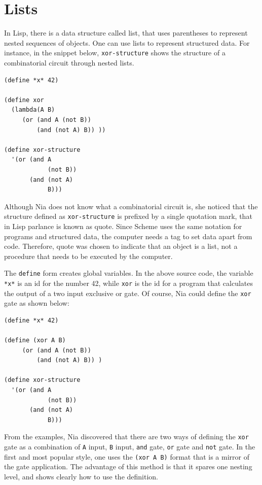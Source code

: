 \documentclass[a4paper,12pt]{book}
\begin{document}
\section{Lists}
In Lisp, there is a data structure called list,
that uses parentheses to represent nested
sequences of objects. One can use lists to
represent structured data.
For instance, in the snippet below,
\verb|xor-structure| shows
the structure of a combinatorial circuit
through nested lists.

\begin{verbatim}
(define *x* 42)

(define xor
  (lambda(A B)
     (or (and A (not B))
         (and (not A) B)) ))

(define xor-structure
  '(or (and A  
            (not B))
       (and (not A) 
            B)))
\end{verbatim}

Although Nia does not know what a combinatorial 
circuit is, she noticed that the structure
defined as \verb|xor-structure| is prefixed by a
single quotation mark, that in Lisp parlance is
known as quote. Since Scheme uses the
same notation for programs and structured
data, the computer needs a tag to set
data apart from code. Therefore, 
quote was chosen to indicate that
an object is a list, not a procedure that
needs to be executed by the computer.

The \verb|define| form creates global
variables. In the above source code,
the variable \verb|*x*| is an id for the
number 42,
while \verb|xor| is the id for a program
that calculates the output of a two
input exclusive or gate. Of course, Nia
could define the \verb|xor| gate as shown below:
\begin{verbatim}
(define *x* 42)

(define (xor A B)
     (or (and A (not B))
         (and (not A) B)) )

(define xor-structure
  '(or (and A 
            (not B))
       (and (not A) 
            B)))
\end{verbatim}

From the examples, Nia discovered that there
are two ways of defining the \verb|xor| gate
as a combination of \verb|A| input, \verb|B| input,
\verb|and| gate, \verb|or| gate
and \verb|not| gate. In the first and
most popular style, one uses the
\verb|(xor A B)| format that is a mirror of
the gate application. The advantage of
this method is that it spares one
nesting level, and shows clearly how to use
the definition. 
\end{document}
